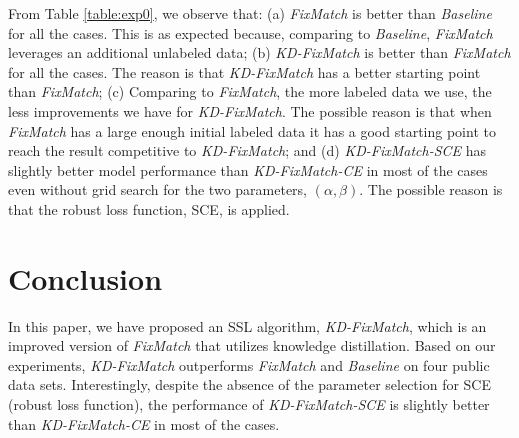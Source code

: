 \documentclass{article}
\begin{document}
From Table \ref{table:exp0}, we observe that:
(a) {\sl FixMatch} is better than {\sl Baseline} for all the cases.
This is as expected because, comparing to {\sl Baseline}, {\sl FixMatch} leverages an additional unlabeled data;
(b) {\sl KD-FixMatch} is better than {\sl FixMatch} for all the cases.
The reason is that {\sl KD-FixMatch} has a better starting point than {\sl FixMatch};
(c) Comparing to {\sl FixMatch}, the more labeled data we use, the less improvements we have for {\sl KD-FixMatch}.
The possible reason is that when {\sl FixMatch} has a large enough initial labeled data it has a good starting point to reach the result competitive to {\sl KD-FixMatch}; and
(d) {\sl KD-FixMatch-SCE} has slightly better model performance than {\sl KD-FixMatch-CE} in most of the cases even without grid search for the two parameters, $(\alpha, \beta)$.
The possible reason is that the robust loss function, SCE, is applied.


\section{Conclusion}
\label{sec:conclusion}

In this paper, we have proposed an SSL algorithm, {\sl KD-FixMatch}, which is an improved version of {\sl FixMatch} that utilizes knowledge distillation.
Based on our experiments, {\sl KD-FixMatch} outperforms {\sl FixMatch} and {\sl Baseline} on four public data sets.
Interestingly, despite the absence of the parameter selection for SCE (robust loss function), the performance of {\sl KD-FixMatch-SCE} is slightly better than {\sl KD-FixMatch-CE} in most of the cases.
\end{document}
